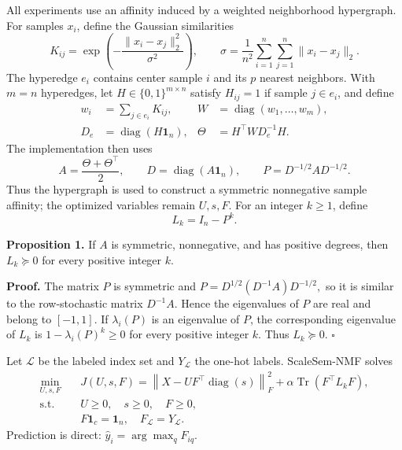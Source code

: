 \documentclass[a4paper,preprint,12pt]{elsarticle}
\theoremstyle{remark}
\newcommand{\diag}{\operatorname{diag}}
\begin{document}
All experiments use an affinity induced by a weighted neighborhood hypergraph. For samples \(x_i\), define the Gaussian similarities
\begin{equation}
\label{eq:gaussian_affinity}
K_{ij}=\exp\!\left(-\frac{\lVert x_i-x_j\rVert_2^2}{\sigma^2}\right),
\qquad
\sigma=\frac{1}{n^2}\sum_{i=1}^n\sum_{j=1}^n\lVert x_i-x_j\rVert_2.
\end{equation}
The hyperedge \(e_i\) contains center sample \(i\) and its \(p\) nearest neighbors. With \(m=n\) hyperedges, let \(H\in\{0,1\}^{m\times n}\) satisfy \(H_{ij}=1\) if sample \(j\in e_i\), and define
\begin{equation}
\label{eq:hypergraph_affinity}
\begin{aligned}
w_i&=\sum_{j\in e_i}K_{ij},&
W&=\diag(w_1,\ldots,w_m),\\
D_e&=\diag(H\mathbf 1_n),&
\Theta&=H^\top W D_e^{-1}H.
\end{aligned}
\end{equation}
The implementation then uses
\begin{equation}
\label{eq:symmetric_operator}
A=\frac{\Theta+\Theta^\top}{2},\qquad
D=\diag(A\mathbf 1_n),\qquad
P=D^{-1/2}AD^{-1/2}.
\end{equation}
Thus the hypergraph is used to construct a symmetric nonnegative sample affinity; the optimized variables remain \(U,s,F\). For an integer \(k\ge1\), define
\[
L_k=I_n-P^k.
\]

\textbf{Proposition 1.} If \(A\) is symmetric, nonnegative, and has positive degrees, then \(L_k\succeq0\) for every positive integer \(k\).

\textbf{Proof.} The matrix \(P\) is symmetric and
$
P=D^{1/2}(D^{-1}A)D^{-1/2},
$
so it is similar to the row-stochastic matrix \(D^{-1}A\). Hence the eigenvalues of \(P\) are real and belong to \([-1,1]\). If \(\lambda_i(P)\) is an eigenvalue of \(P\), the corresponding eigenvalue of \(L_k\) is \(1-\lambda_i(P)^k\ge0\) for every positive integer \(k\). Thus \(L_k\succeq0\). \(\square\)

Let \(\mathcal L\) be the labeled index set and \(Y_{\mathcal L}\) the one-hot labels. ScaleSem-NMF solves
\begin{equation}
\label{eq:scalesemnmf_objective}
\begin{aligned}
\min_{U,s,F}\quad &
J(U,s,F)=\left\lVert X-UF^\top\operatorname{diag}(s)\right\rVert_F^2
+\alpha\operatorname{Tr}(F^\top L_kF),\\
\text{s.t.}\quad &U\ge0,\quad s\ge0,\quad F\ge0,\\
&F\mathbf 1_c=\mathbf 1_n,\quad F_{\mathcal L}=Y_{\mathcal L}.
\end{aligned}
\end{equation}
Prediction is direct: \(\widehat y_i=\arg\max_q F_{iq}\).
\end{document}
